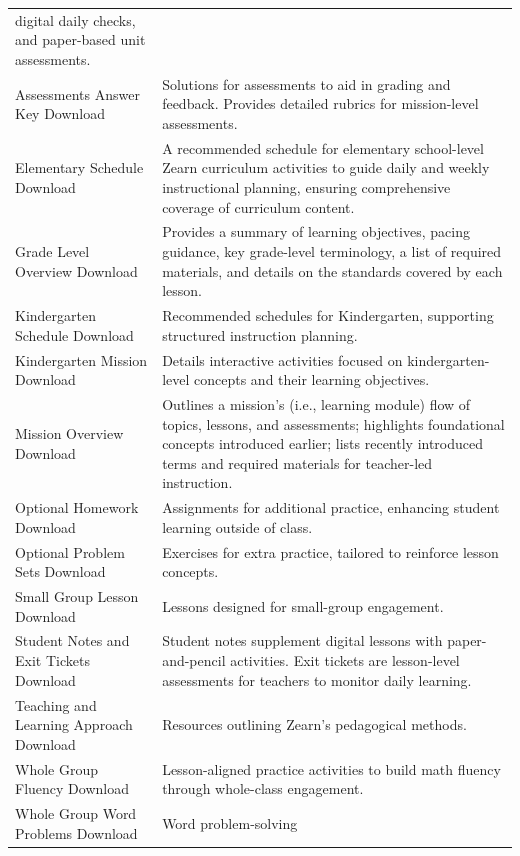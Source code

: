\documentclass[
  number,
  preprint,
  3p,
  onecolumn]{elsarticle}
\begin{document}
\begin{longtable}[]{@{}
  >{\raggedright\arraybackslash}p{}
  >{\raggedright\arraybackslash}p{}@{}}
digital daily checks, and paper-based unit assessments. \\
Assessments Answer Key Download \citep{zearnc} & Solutions for
assessments to aid in grading and feedback. Provides detailed rubrics
for mission-level assessments. \\
Elementary Schedule Download \citep{zearne} & A recommended schedule for
elementary school-level Zearn curriculum activities to guide daily and
weekly instructional planning, ensuring comprehensive coverage of
curriculum content. \\
Grade Level Overview Download \citep{zearnf} & Provides a summary of
learning objectives, pacing guidance, key grade-level terminology, a
list of required materials, and details on the standards covered by each
lesson. \\
Kindergarten Schedule Download \citep{zearng} & Recommended schedules
for Kindergarten, supporting structured instruction planning. \\
Kindergarten Mission Download \citep{zearnh} & Details interactive
activities focused on kindergarten-level concepts and their learning
objectives. \\
Mission Overview Download \citep{zearnf} & Outlines a mission's (i.e.,
learning module) flow of topics, lessons, and assessments; highlights
foundational concepts introduced earlier; lists recently introduced
terms and required materials for teacher-led instruction. \\
Optional Homework Download \citep{zearnj} & Assignments for additional
practice, enhancing student learning outside of class. \\
Optional Problem Sets Download \citep{zearnk} & Exercises for extra
practice, tailored to reinforce lesson concepts. \\
Small Group Lesson Download \citep{zearnl} & Lessons designed for
small-group engagement. \\
Student Notes and Exit Tickets Download \citep{zearnz, zearny} & Student
notes supplement digital lessons with paper-and-pencil activities. Exit
tickets are lesson-level assessments for teachers to monitor daily
learning. \\
Teaching and Learning Approach Download \citep{zearnn} & Resources
outlining Zearn's pedagogical methods. \\
Whole Group Fluency Download \citep{zearno} & Lesson-aligned practice
activities to build math fluency through whole-class engagement. \\
Whole Group Word Problems Download \citep{zearnl} & Word problem-solving

\end{longtable}
\end{document}
